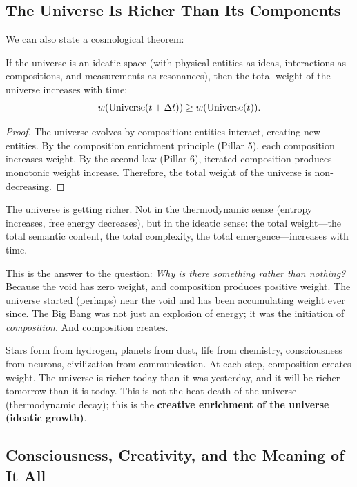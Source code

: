 \subsection{The Universe Is Richer Than Its Components}

We can also state a cosmological theorem:

\begin{theorem}
\label{thm:cosmological}
If the universe is an ideatic space (with physical entities as ideas,
interactions as compositions, and measurements as resonances), then the total
weight of the universe increases with time:
\[
  w(\text{Universe}(t + \Delta t)) \geq w(\text{Universe}(t)).
\]
\end{theorem}

\begin{proof}
The universe evolves by composition: entities interact, creating new entities.
By the composition enrichment principle (Pillar 5), each composition increases
weight. By the second law (Pillar 6), iterated composition produces monotonic
weight increase. Therefore, the total weight of the universe is non-decreasing.
\end{proof}

\begin{interpretation}
The universe is getting richer. Not in the thermodynamic sense (entropy
increases, free energy decreases), but in the ideatic sense: the total weight---the
total semantic content, the total complexity, the total emergence---increases
with time.

This is the answer to the question: \emph{Why is there something rather than
nothing?} Because the void has zero weight, and composition produces positive
weight. The universe started (perhaps) near the void and has been accumulating
weight ever since. The Big Bang was not just an explosion of energy; it was
the initiation of \emph{composition}. And composition creates.

Stars form from hydrogen, planets from dust, life from chemistry, consciousness
from neurons, civilization from communication. At each step, composition
creates weight. The universe is richer today than it was yesterday, and it
will be richer tomorrow than it is today. This is not the heat death of the
universe (thermodynamic decay); this is the \textbf{creative enrichment of
the universe (ideatic growth)}.
\end{interpretation}

\subsection{Consciousness, Creativity, and the Meaning of It All}

